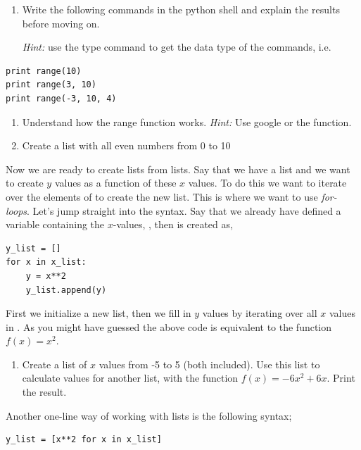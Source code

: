 \documentclass{article}
\begin{document}
\begin{enumerate}[resume]
  \item Write the following commands in the python shell and explain the results
    before moving on.

    {\em Hint:} use the type command to get the data type of the commands,
    i.e. 
\end{enumerate}


\begin{lstlisting}
print range(10)
print range(3, 10)
print range(-3, 10, 4)
\end{lstlisting}

\begin{enumerate}[resume]
    \item Understand how the range function works.
        {\em Hint:} Use google or the  function.
    \item Create a list with all even numbers from 0 to 10
\end{enumerate}

Now we are ready to create lists from lists.
Say that we have a list  and we want to create $y$ values as a function of these $x$ values.
To do this we want to iterate over the elements of  to create the new list.
This is where we want to use {\em for-loops}.
Let's jump straight into the syntax.
Say that we already have defined a variable containing the $x$-values, , then  is created as,

\begin{lstlisting}
y_list = []
for x in x_list:
    y = x**2
    y_list.append(y)
\end{lstlisting}

First we initialize a new list, then we fill in $y$ values by iterating over all $x$ values in .
As you might have guessed the above code is equivalent to the function $f(x) = x^2$.

\begin{enumerate}[resume]
    \item Create a list of $x$ values from -5 to 5 (both included).
    Use this list to calculate values for another list, with the function $f(x) = -6x^2 + 6x$.
    Print the result.\label{new y values}
\end{enumerate}

Another one-line way of working with lists is the following syntax;

\begin{lstlisting}
y_list = [x**2 for x in x_list]
\end{lstlisting}
\end{document}
